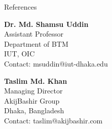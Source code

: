 \documentclass[
	a4paper,
	12pt,
]{resume}
\begin{document}
\begin{rSection}{References}

	\begin{multicols}{2}

		\textbf{Dr. Md. Shamsu Uddin}	\\
		Assistant Professor				\\
		Department of BTM				\\
		IUT, OIC						\\
		Contact: msuddin@iut-dhaka.edu

		\columnbreak

		\textbf{Taslim Md. Khan}		\\
		Managing Director				\\
		AkijBashir Group				\\
		Dhaka, Bangladesh				\\
		Contact: taslim@akijbashir.com

	\end{multicols}

\end{rSection}
\end{document}
